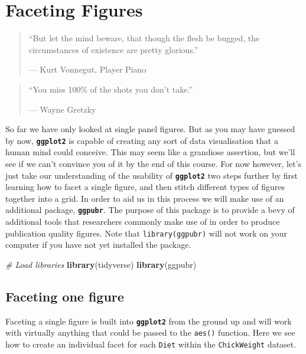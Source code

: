 \documentclass[
]{book}
\newenvironment{Shaded}{\begin{snugshade}}{\end{snugshade}}
\newcommand{\CommentTok}[1]{\textcolor[rgb]{0.56,0.35,0.01}{\textit{#1}}}
\newcommand{\KeywordTok}[1]{\textcolor[rgb]{0.13,0.29,0.53}{\textbf{#1}}}
\newcommand{\NormalTok}[1]{#1}
\begin{document}
\hypertarget{faceting}{%
\chapter{Faceting Figures}\label{faceting}}

\begin{quote}
``But let the mind beware, that though the flesh be bugged, the circumstances of existence are pretty glorious.''

--- Kurt Vonnegut, Player Piano
\end{quote}

\begin{quote}
``You miss 100\% of the shots you don't take.''

--- Wayne Gretzky
\end{quote}

So far we have only looked at single panel figures. But as you may have guessed by now, \textbf{\texttt{ggplot2}} is capable of creating any sort of data visualisation that a human mind could conceive. This may seem like a grandiose assertion, but we'll see if we can't convince you of it by the end of this course. For now however, let's just take our understanding of the usability of \textbf{\texttt{ggplot2}} two steps further by first learning how to facet a single figure, and then stitch different types of figures together into a grid. In order to aid us in this process we will make use of an additional package, \textbf{\texttt{ggpubr}}. The purpose of this package is to provide a bevy of additional tools that researchers commonly make use of in order to produce publication quality figures. Note that \texttt{library(ggpubr)} will not work on your computer if you have not yet installed the package.

\begin{Shaded}
\begin{Highlighting}[]
\CommentTok{\# Load libraries}
\KeywordTok{library}\NormalTok{(tidyverse)}
\KeywordTok{library}\NormalTok{(ggpubr)}
\end{Highlighting}
\end{Shaded}

\hypertarget{faceting-one-figure}{%
\section{Faceting one figure}\label{faceting-one-figure}}

Faceting a single figure is built into \textbf{\texttt{ggplot2}} from the ground up and will work with virtually anything that could be passed to the \texttt{aes()} function. Here we see how to create an individual facet for each \texttt{Diet} within the \texttt{ChickWeight} dataset.
\end{document}
